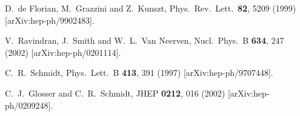 \documentclass[12pt]{article}
\begin{document}
\begin{thebibliography}{99}
%
D.~de Florian, M.~Grazzini and Z.~Kunszt,
Phys.\ Rev.\ Lett.\  {\bf 82}, 5209 (1999)
[arXiv:hep-ph/9902483].

V.~Ravindran, J.~Smith and W.~L.~Van Neerven,
Nucl.\ Phys.\ B {\bf 634}, 247 (2002)
[arXiv:hep-ph/0201114].

C.~R.~Schmidt,
Phys.\ Lett.\ B {\bf 413}, 391 (1997)
[arXiv:hep-ph/9707448].

C.~J.~Glosser and C.~R.~Schmidt,
JHEP {\bf 0212}, 016 (2002)
[arXiv:hep-ph/0209248].

\end{thebibliography}
\end{document}
